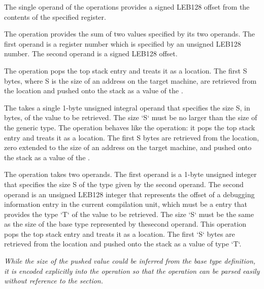 \begin{enumerate}[1. ]
\itembfnl{\DWOPbregzeroTARG, \DWOPbregoneTARG, \dots,
  \DWOPbregthirtyoneTARG} The single operand of the \DWOPbregnTARG{}
operations provides a signed LEB128 offset
from the contents of the specified register.

\itembfnl{\DWOPbregxTARG}
The \DWOPbregxNAME{} operation provides the sum of two values
specified by its two operands. The first operand is a register number
which is specified by an unsigned LEB128
number. The second operand is a signed
LEB128 offset.

\itembfnl{\DWOPderefTARG}
The \DWOPderefNAME{} operation pops the top stack entry and treats it
as a location. The first S bytes, where S is the size of an address on
the target machine, are retrieved from the location and pushed onto
the stack as a value of the \generictype{}.

\itembfnl{\DWOPderefsizeTARG}

The \DWOPderefsizeNAME{} takes a single 1-byte unsigned integral
operand that specifies the size S, in bytes, of the value to be
retrieved. The size `S` must be no larger than the size of the generic
type. The operation behaves like the \DWOPderef{} operation: it pops
the top stack entry and treats it as a location. The first S bytes are
retrieved from the location, zero extended to the size of an address
on the target machine, and pushed onto the stack as a value of the
\generictype{}.

\itembfnl{\DWOPdereftypeTARG}

The \DWOPdereftypeNAME{} operation takes two operands. The first
operand is a 1-byte unsigned integer that specifies the size S of the
type given by the second operand. The second operand is an unsigned
LEB128 integer that represents the offset of a debugging information
entry in the current compilation unit, which must be a
\DWTAGbasetype{} entry that provides the type `T` of the value to be
retrieved. The size `S` must be the same as the size of the base type
represented by thesecond operand. This operation pops the top stack
entry and treats it as a location. The first `S` bytes are retrieved
from the location and pushed onto the stack as a value of type `T`.

\textit{While the size of the pushed value could be inferred from the
base type definition, it is encoded explicitly into the operation so
that the operation can be parsed easily without reference to the
\dotdebuginfo{} section.}


\end{enumerate}
